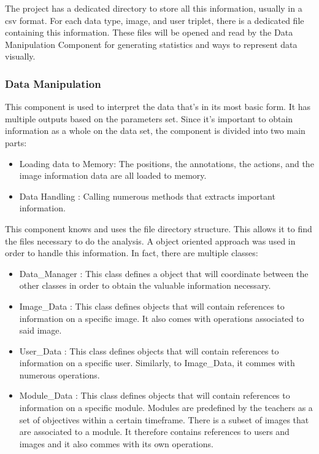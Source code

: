 \documentclass[a4paper,11pt]{report}
\numberwithin{figure}{section} %
\begin{document}
        
        The project has a dedicated directory to store all this information, usually in a csv format.
        For each data type, image, and user triplet, there is a dedicated file containing this information.
        These files will be opened and read by the Data Manipulation Component for generating statistics and ways to represent data visually.
        
        
	\subsubsection{Data Manipulation}
    
    This component is used to interpret the data that's in its most basic form.
    It has multiple outputs based on the parameters set.
    Since it's important to obtain information as a whole on the data set, the component is divided into two main parts:
    \begin{itemize}
        \item[\textbullet] Loading data to Memory: The positions, the annotations, the actions, and the image information data are all loaded to memory.
        \item[\textbullet] Data Handling : Calling numerous methods that extracts important information.
    \end{itemize}

    This component knows and uses the file directory structure.
    This allows it to find the files necessary to do the analysis.
    A object oriented approach was used in order to handle this information.
    In fact, there are multiple classes:

    \begin{itemize}
        \item[\textbullet] Data\_Manager : This class defines a object that will coordinate between the other classes in order to obtain the valuable information necessary.
        \item[\textbullet] Image\_Data : This class defines objects that will contain references to information on a specific image.
        It also comes with operations associated to said image.
        \item[\textbullet] User\_Data : This class defines objects that will contain references to information on a specific user.
        Similarly, to Image\_Data, it commes with numerous operations.
        \item[\textbullet] Module\_Data : This class defines objects that will contain references to information on a specific module.
        Modules are predefined by the teachers as a set of objectives within a certain timeframe.
        There is a subset of images that are associated to a module.
        It therefore contains references to users and images and it also commes with its own operations.
    \end{itemize}
\end{document}
